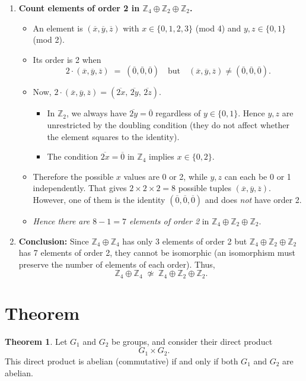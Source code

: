 \documentclass[12pt]{article}
\theoremstyle{definition} %
\newtheorem{theorem}{Theorem}
\theoremstyle{plain} %
\begin{document}
\begin{enumerate}
  \item \textbf{Count elements of order 2 in \(\mathbb{Z}_4 \oplus \mathbb{Z}_2 \oplus \mathbb{Z}_2\).}
    \begin{itemize}
      \item An element is $(\overline{x}, \overline{y}, \overline{z})$ with $x \in \{0,1,2,3\}$ (mod 4) and $y,z \in \{0,1\}$ (mod 2).
      \item Its order is 2 when
      \[
        2 \cdot (\overline{x}, \overline{y}, \overline{z}) 
        \;=\; (\overline{0}, \overline{0}, \overline{0})
        \quad \text{but} \quad
        (\overline{x},\overline{y},\overline{z}) \neq (\overline{0},\overline{0},\overline{0}).
      \]
      \item Now, $2\cdot(\overline{x}, \overline{y}, \overline{z}) 
      = (\overline{2x},\,\overline{2y},\,\overline{2z})$. 
      \begin{itemize}
        \item In $\mathbb{Z}_2$, we always have $\overline{2y} = \overline{0}$ regardless of $y\in\{0,1\}$. Hence $y,z$ are unrestricted by the doubling condition (they do not affect whether the element squares to the identity).
        \item The condition $\overline{2x} = \overline{0}$ in $\mathbb{Z}_4$ implies $x \in \{0,2\}$.
      \end{itemize}
      \item Therefore the possible $x$ values are 0 or 2, while $y,z$ can each be 0 or 1 independently. That gives $2 \times 2 \times 2 = 8$ possible tuples $(\overline{x},\overline{y},\overline{z})$. However, one of them is the identity $(\overline{0},\overline{0},\overline{0})$ and does \emph{not} have order 2.
      \item \emph{Hence there are $8 - 1 = 7$ elements of order 2} in $\mathbb{Z}_4 \oplus \mathbb{Z}_2 \oplus \mathbb{Z}_2$.
    \end{itemize}

  \item \textbf{Conclusion:} Since $\mathbb{Z}_4 \oplus \mathbb{Z}_4$ has only 3 elements of order 2 but $\mathbb{Z}_4 \oplus \mathbb{Z}_2 \oplus \mathbb{Z}_2$ has 7 elements of order 2, they cannot be isomorphic (an isomorphism must preserve the number of elements of each order). Thus,
  \[
    \mathbb{Z}_4 \oplus \mathbb{Z}_4 
    \;\not\simeq\; 
    \mathbb{Z}_4 \oplus \mathbb{Z}_2 \oplus \mathbb{Z}_2.
  \]
\end{enumerate}

\section*{Theorem}
\begin{theorem}
Let $G_1$ and $G_2$ be groups, and consider their direct product
\[
  G_1 \times G_2.
\]
This direct product is abelian (commutative) if and only if both $G_1$ and $G_2$ are abelian.
\end{theorem}
\end{document}

